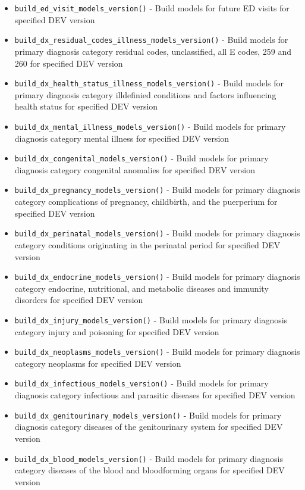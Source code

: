 \documentclass[
]{book}
\providecommand{\tightlist}{%
  \setlength{\itemsep}{0pt}\setlength{\parskip}{0pt}}
\begin{document}
\begin{itemize}
\tightlist
\item
  \texttt{build\_ed\_visit\_models\_version()} - Build models for future ED visits for specified DEV version
\item
  \texttt{build\_dx\_residual\_codes\_illness\_models\_version()} - Build models for primary diagnosis category residual codes, unclassified, all E codes, 259 and 260 for specified DEV version
\item
  \texttt{build\_dx\_health\_status\_illness\_models\_version()} - Build models for primary diagnosis category illdefinied conditions and factors influencing health status for specified DEV version
\item
  \texttt{build\_dx\_mental\_illness\_models\_version()} - Build models for primary diagnosis category mental illness for specified DEV version
\item
  \texttt{build\_dx\_congenital\_models\_version()} - Build models for primary diagnosis category congenital anomalies for specified DEV version
\item
  \texttt{build\_dx\_pregnancy\_models\_version()} - Build models for primary diagnosis category complications of pregnancy, childbirth, and the puerperium for specified DEV version
\item
  \texttt{build\_dx\_perinatal\_models\_version()} - Build models for primary diagnosis category conditions originating in the perinatal period for specified DEV version
\item
  \texttt{build\_dx\_endocrine\_models\_version()} - Build models for primary diagnosis category endocrine, nutritional, and metabolic diseases and immunity disorders for specified DEV version
\item
  \texttt{build\_dx\_injury\_models\_version()} - Build models for primary diagnosis category injury and poisoning for specified DEV version
\item
  \texttt{build\_dx\_neoplasms\_models\_version()} - Build models for primary diagnosis category neoplasms for specified DEV version
\item
  \texttt{build\_dx\_infectious\_models\_version()} - Build models for primary diagnosis category infectious and parasitic diseases for specified DEV version
\item
  \texttt{build\_dx\_genitourinary\_models\_version()} - Build models for primary diagnosis category diseases of the genitourinary system for specified DEV version
\item
  \texttt{build\_dx\_blood\_models\_version()} - Build models for primary diagnosis category diseases of the blood and bloodforming organs for specified DEV version

\end{itemize}
\end{document}
